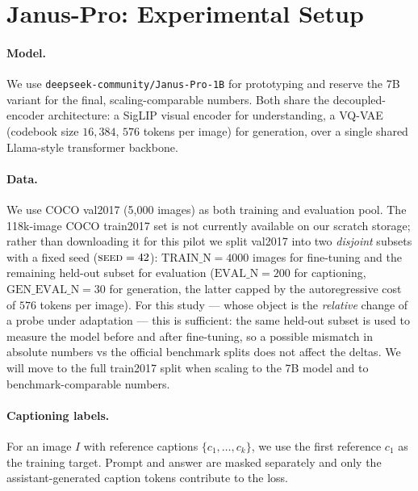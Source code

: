 \section{Janus-Pro: Experimental Setup}
\label{sec:janus_setup}

\paragraph{Model.} We use \texttt{deepseek-community/Janus-Pro-1B} for
prototyping and reserve the 7B variant for the final, scaling-comparable
numbers. Both share the decoupled-encoder architecture: a SigLIP visual encoder
for understanding, a VQ-VAE (codebook size $16{,}384$, $576$ tokens per image)
for generation, over a single shared Llama-style transformer backbone.

\paragraph{Data.} We use COCO val2017 (5{,}000 images) as both training and
evaluation pool. The 118k-image COCO train2017 set is not currently available
on our scratch storage; rather than downloading it for this pilot we split
val2017 into two \emph{disjoint} subsets with a fixed seed
($\textsc{seed}=42$): $\text{TRAIN\_N}=4000$ images for fine-tuning and the
remaining held-out subset for evaluation
($\text{EVAL\_N}=200$ for captioning, $\text{GEN\_EVAL\_N}=30$ for generation,
the latter capped by the autoregressive cost of $576$ tokens per image). For
this study --- whose object is the \emph{relative} change of a probe under
adaptation --- this is sufficient: the same held-out subset is used to measure
the model before and after fine-tuning, so a possible mismatch in absolute
numbers vs the official benchmark splits does not affect the deltas. We will
move to the full train2017 split when scaling to the 7B model and to
benchmark-comparable numbers.

\paragraph{Captioning labels.} For an image $I$ with reference captions
$\{c_1, \dots, c_k\}$, we use the first reference $c_1$ as the training target.
Prompt and answer are masked separately and only the assistant-generated
caption tokens contribute to the loss.


